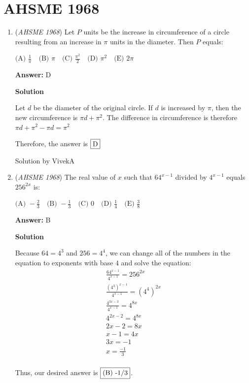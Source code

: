 \section{AHSME 1968}
        \begin{enumerate}
        	\item (\textit{AHSME 1968}) Let $P$ units be the increase in circumference of a circle resulting from an increase in $\pi$ units in the diameter. Then $P$ equals:


 $\text{(A) } \frac{1}{\pi}\quad\text{(B) } \pi\quad\text{(C) } \frac{\pi^2}{2}\quad\text{(D) } \pi^2\quad\text{(E) } 2\pi$

 \textbf{Answer: }D



\textbf{Solution}

Let $d$ be the diameter of the original circle. If $d$ is increased by $\pi$, then the new circumference is $\pi d + \pi^2$. The difference in circumference is therefore $\pi d + \pi^2 - \pi d = \pi^2$ 

 Therefore, the answer is $\fbox{D}$

 Solution by VivekA

 


	\item (\textit{AHSME 1968}) The real value of $x$ such that $64^{x-1}$ divided by $4^{x-1}$ equals $256^{2x}$ is:


 $\text{(A) } -\frac{2}{3}\quad\text{(B) } -\frac{1}{3}\quad\text{(C) } 0\quad\text{(D) } \frac{1}{4}\quad\text{(E) } \frac{3}{8}$

 \textbf{Answer: }B



\textbf{Solution}

Because $64=4^3$ and $256=4^4$, we can change all of the numbers in the equation to exponents with base $4$ and solve the equation:\begin{align*}\frac{64^{x-1}}{4^{x-1}}=256^{2x} \\\frac{(4^3)^{x-1}}{4^{x-1}}=(4^4)^{2x} \\\frac{4^{3x-3}}{4^{x-1}}=4^{8x} \\4^{2x-2}=4^{8x} \\2x-2=8x \\x-1=4x \\ 3x=-1 \\x=\frac{-1}{3} \\\end{align*}


 Thus, our desired answer is $\fbox{(B) -1/3}$.


\end{enumerate}
